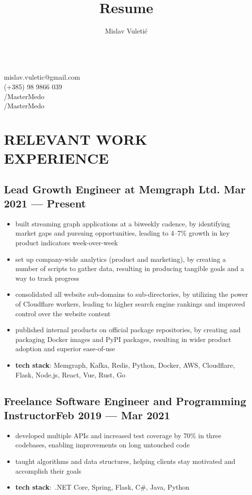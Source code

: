 \documentclass{article}
\begin{document}
\title{Resume}
\author{Mislav Vuletić}

\begin{multicols}{2}
  \fontsize{20}{20}\bfseries
  \theauthor{}

  \fontsize{15}{15}\mdseries
  \mbox{}\\
   mislav.vuletic@gmail.com\\
   (+385) 98 9866 039\\
  /MasterMedo\\
  /MasterMedo
\end{multicols}


\normalsize

\section{RELEVANT WORK EXPERIENCE}
\subsection{Lead Growth Engineer at Memgraph Ltd. \hfill Mar 2021 --- Present}
\begin{itemize}
  \itemsep0em
  \item built streaming graph applications at a biweekly cadence, by identifying market gaps and pursuing opportunities, leading to 4--7\% growth in key product indicators week-over-week
  \item set up company-wide analytics (product and marketing), by creating a number of scripts to gather data, resulting in producing tangible goals and a way to track progress
  \item consolidated all website sub-domains to sub-directories, by utilizing the power of Cloudflare workers, leading to higher search engine rankings and improved control over the website content
  \item published internal products on official package repositories, by creating and packaging Docker images and PyPI packages, resulting in wider product adoption and superior ease-of-use
  \item {\bfseries tech stack}: Memgraph, Kafka, Redis, Python, Docker, AWS, Cloudflare, Flask, Node.js, React, Vue, Rust, Go
\end{itemize}

\subsection{Freelance Software Engineer and Programming Instructor\hfill Feb 2019 --- Mar 2021}
\begin{itemize}
  \itemsep0em
  \item developed multiple APIs and increased test coverage by 70\% in three codebases, enabling improvements on long untouched code
  \item taught algorithms and data structures, helping clients stay motivated and accomplish their goals
  \item {\bfseries tech stack}:~.NET Core, Spring, Flask, C\#, Java, Python
\end{itemize}
\end{document}
